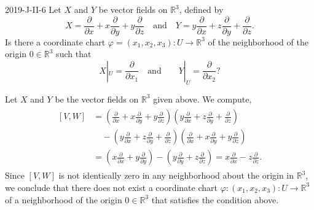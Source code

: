 \documentclass{article}
\begin{document}
	\begin{prb}{2019-J-II-6}
		Let $X$ and $Y$ be vector fields on $\mathbb{R}^{3}$, defined by 
		\begin{equation*}
			X = \frac{\partial}{\partial x} + x\frac{\partial}{\partial y} + y\frac{\partial}{\partial z} \quad \text{and} \quad Y = y\frac{\partial}{\partial x} + z\frac{\partial}{\partial y} + \frac{\partial}{\partial z}. 
		\end{equation*}
		Is there a coordinate chart $\varphi = (x_{1}, x_{2}, x_{3}): U \to \mathbb{R}^{3}$ of the neighborhood of the origin $0 \in \mathbb{R}^{3}$ such that 
		\begin{equation*}
			X|_{U} = \frac{\partial}{\partial x_{1}} \quad \text{and} \qquad Y|_{U} = \frac{\partial}{\partial x_{2}}?
		\end{equation*}
	\end{prb}
	Let $X$ and $Y$ be the vector fields on $\mathbb{R}^{3}$ given above. We compute, 
	\begin{align*}
		\begin{split}
			[V, W] &= \left(\frac{\partial}{\partial x} + x\frac{\partial}{\partial y} + y\frac{\partial}{\partial z}\right)\left(y\frac{\partial}{\partial x} + z\frac{\partial}{\partial y} + \frac{\partial}{\partial z}\right) \\
			&\quad - \left(y\frac{\partial}{\partial x} + z\frac{\partial}{\partial y} + \frac{\partial}{\partial z}\right)\left(\frac{\partial}{\partial x} + x\frac{\partial}{\partial y} + y\frac{\partial}{\partial z}\right) \\
			&= \left(x\frac{\partial}{\partial x} + y\frac{\partial}{\partial y}\right) - 
			\left(y\frac{\partial}{\partial y} + z\frac{\partial}{\partial z}\right) = x\frac{\partial}{\partial x} - z\frac{\partial}{\partial z}. 
		\end{split}
	\end{align*}
	Since $[V, W]$ is not identically zero in any neighborhood about the origin in $\mathbb{R}^{3}$, we conclude that there does not exist a coordinate chart $\varphi: (x_{1}, x_{2}, x_{3}): U \to \mathbb{R}^{3}$ of a neighborhood of the origin $0 \in \mathbb{R}^{3}$ that satisfies the condition above. 
	
\end{document}
